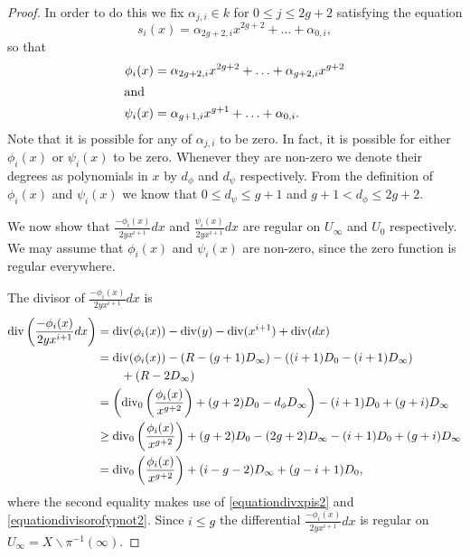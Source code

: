 \begin{proof}
    
    In order to do this we fix $\alpha_{j,i} \in k$ for $0\leq j \leq 2g+2$ satisfying the equation
        \[
        s_i(x) = \alpha_{2g+2,i}x^{2g+2} + \ldots + \alpha_{0,i},
        \]
    so that
        \begin{align*}
        \phi_i(x) & = \alpha_{2g+2,i}x^{2g+2} + \ldots + \alpha_{g+2,i}x^{g+2} \\
        \intertext{and }
        \psi_i(x) & = \alpha_{g+1,i}x^{g+1} + \ldots + \alpha_{0,i}.
        \end{align*}
    Note that it is possible for any of $\alpha_{j,i}$ to be zero. In fact, it is possible for either $\phi_i(x)$ or $\psi_i(x)$ to be zero.
    Whenever they are non-zero we denote their degrees as polynomials in $x$ by $d_\phi$ and $d_\psi$ respectively. From the definition of $\phi_i(x)$ and $\psi_i(x)$ we know that $0 \leq d_\psi \leq g+1$ and $g+1 < d_\phi \leq 2g+2$.
    
    
    We now show that $\frac{-\phi_i(x)}{2yx^{i+1}}dx$ and $\frac{\psi_i(x)}{2yx^{i+1}}dx$ are regular on $U_\infty$ and $U_0$ respectively.
    We may assume that $\phi_i(x)$ and $\psi_i(x)$ are non-zero, since the zero function is regular everywhere.
    
    
    The divisor of $\frac{-\phi_i(x)}{2yx^{i+1}}dx$ is
        \begin{align*}
        \operatorname{div}\left( \frac{-\phi_i(x)}{2yx^{i+1}}dx \right) & =  \operatorname{div}(\phi_i(x)) -\operatorname{div}(y) - \operatorname{div}(x^{i+1}) + \operatorname{div} (dx) \\
        & =  \operatorname{div}(\phi_i(x)) - ( R - (g+1)D_\infty) - ((i+1)D_0 - (i+1)D_\infty) \\
        & \qquad + (R - 2D_\infty) \\
        & =  \left( \operatorname{div}_0\left( \frac{\phi_i(x)}{x^{g+2}}\right) + (g+2)D_0 - d_\phi D_\infty\right) - (i+1)D_0 + (g+i)D_\infty \\
        & \geq  \operatorname{div}_0\left( \frac{\phi_i(x)}{x^{g+2}}\right) + (g+2)D_0 - (2g+2)D_\infty - (i+1)D_0 + (g+i)D_\infty \\
        & =  \operatorname{div}_0\left( \frac{\phi_i(x)}{x^{g+2}} \right) + (i-g-2)D_\infty + (g-i+1)D_0,
        \end{align*}
    where the second equality makes use of \eqref{equationdivxpis2} and \eqref{equationdivisorofypnot2}.
    Since $i \leq g$ the differential $\frac{-\phi_i(x)}{2yx^{i+1}}dx$ is regular on $U_\infty = X\backslash \pi^{-1}(\infty)$.
    

\end{proof}
